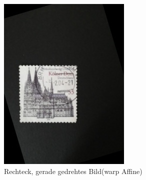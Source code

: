 \documentclass[12pt,toc=bib,toc=listof]{scrreprt}
\begin{document}
\begin{figure}[h]
\begin{minipage}[t]{.2\linewidth}
  \includegraphics[width=\linewidth]{./../bilder/rot_col}
  \caption{Rechteck, gerade gedrehtes Bild(warp Affine)}
  \label{fig:bv_rotimg}
\end{minipage}
\end{figure}
\end{document}

